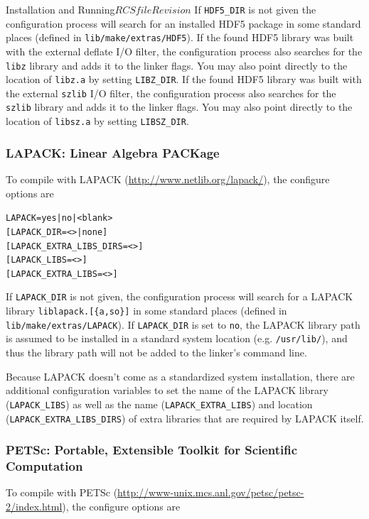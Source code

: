 \begin{cactuspart}{Installation and Running}{$RCSfile$}{$Revision$}
If \texttt{HDF5\_DIR} is not given the configuration process will search for an
installed HDF5 package in some standard places (defined in
\texttt{lib/make/extras/HDF5}).
If the found HDF5 library was built with the external deflate I/O filter,
the configuration process also searches for the \texttt{libz} library and adds
it to the linker flags. You may also point directly to the location of
\texttt{libz.a} by setting \texttt{LIBZ\_DIR}.
If the found HDF5 library was built with the external \texttt{szlib} I/O filter,
the configuration process also searches for the \texttt{szlib} library and adds
it to the linker flags. You may also point directly to the location of
\texttt{libsz.a} by setting \texttt{LIBSZ\_DIR}.


\subsubsection{LAPACK: Linear Algebra PACKage}

To compile with LAPACK (\url{http://www.netlib.org/lapack/}),
the configure options are

\begin{alltt}
LAPACK = yes | no | <blank>
[ LAPACK\_DIR = <> | none ]
[ LAPACK\_EXTRA\_LIBS\_DIRS = <> ]
[ LAPACK\_LIBS = <> ]
[ LAPACK\_EXTRA\_LIBS = <> ]
\end{alltt}

If \texttt{LAPACK\_DIR} is not given, the configuration process will search for a
LAPACK library \texttt{liblapack.[\{a,so\}]} in some standard places (defined in
\texttt{lib/make/extras/LAPACK}). If \texttt{LAPACK\_DIR} is set to \texttt{no},
the LAPACK library path is assumed to be installed in a standard system location
(e.g. \texttt{/usr/lib/}), and thus the library path will not be added to the
linker's command line.

Because LAPACK doesn't come as a standardized system installation, there are
additional configuration variables to set the name of the LAPACK library
(\texttt{LAPACK\_LIBS}) as well as the name (\texttt{LAPACK\_EXTRA\_LIBS}) and
location (\texttt{LAPACK\_EXTRA\_LIBS\_DIRS}) of extra libraries that are
required by LAPACK itself.


\subsubsection{PETSc: Portable, Extensible Toolkit for Scientific Computation}

To compile with PETSc
(\url{http://www-unix.mcs.anl.gov/petsc/petsc-2/index.html}),
the configure options are


\end{cactuspart}
